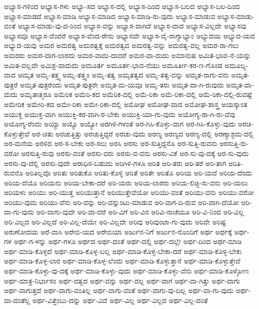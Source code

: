 {ಅಭ್ಯಾಸ-ಗಳಿಂದ
ಅಭ್ಯಾಸ-ಗಳು
ಅಭ್ಯಾ-ಸದ
ಅಭ್ಯಾಸ-ದಲ್ಲಿ
ಅಭ್ಯಾಸ-ದಿಂದ
ಅಭ್ಯಾಸ-ಬಲದ
ಅಭ್ಯಾಸ-ಬಲ-ದಿಂದ
ಅಭ್ಯಾಸ-ಮಾಡದೆ
ಅಭ್ಯಾಸ-ಮಾಡಿ
ಅಭ್ಯಾಸ-ಮಾಡಿದ
ಅಭ್ಯಾಸ-ಮಾಡಿ-ರು-ವುದು
ಅಭ್ಯಾಸ-ಮಾಡುವ
ಅಭ್ಯಾಸ-ಮಾಡು-ವಂತೆ
ಅಭ್ಯಾಸ-ಮಾಡು-ವು-ದ-ರಿಂದ
ಅಭ್ಯಾಸ-ವನ್ನು
ಅಭ್ಯಾಸ-ವಾಗಿದೆ
ಅಭ್ಯಾಸ-ವಾದ
ಅಭ್ಯಾಸ-ವಿಲ್ಲದೇ
ಅಭ್ಯಾಸವು
ಅಭ್ಯಾಸವೂ
ಅಭ್ಯಾಸ-ವೆಂದರೆ
ಅಭ್ಯಾಸ-ವೆಂದ-ರೇನು
ಅಭ್ಯಾಸವೇ
ಅಭ್ಯಾಸ-ವೈ-ರಾಗ್ಯಾಭ್ಯಾಂ
ಅಭ್ಯುದಯ
ಅಭ್ಯುದ-ಯದ
ಅಭ್ಯುದ-ಯವು
ಅಮರ
ಅಮರತ್ವ
ಅಮರತ್ವಕ್ಕೆ
ಅಮರತ್ವದ
ಅಮರತ್ವ-ವನ್ನು
ಅಮರತ್ವ-ವಲ್ಲ
ಅಮರ-ರಾ-ಗಲು
ಅಮರರು
ಅಮರ-ವಾಗ-ಲಾರದು
ಅಮರ-ವಾದು-ದಾದರೆ
ಅಮರ-ವಾ-ದುದು
ಅಮಾನುಷ
ಅಮಿತ-ಭಾವ-ನೆ-ಯನ್ನು
ಅಮಿತ-ವಲ್ಲವೇ
ಅಮಿಶ್ರ-ವಾದುದು
ಅಮೂರ್ತ
ಅಮೂರ್ತ-ಭಾವ-ನೆಯು
ಅಮೂರ್ತೀ-ಕರ-ಣ-ಗೊಂಡ
ಅಮೂಲ್ಯ-ವಾದ
ಅಮೃತ
ಅಮೃ-ತತ್ತ್ವ
ಅಮೃ-ತತ್ತ್ವಂ
ಅಮೃ-ತತ್ವ
ಅಮೃತತ್ವದ
ಅಮೃ-ತತ್ವ-ವನ್ನು
ಅಮೃತ-ನಾಗು-ವನು
ಅಮೃತ-ಪುತ್ರರೆ
ಅಮೃತ-ಪುತ್ರರೆಂದು
ಅಮೃತ-ಪುತ್ರರೇ
ಅಮೃತ-ಮ-ಯವೂ
ಅಮೃ-ತರು
ಅಮೃತ-ವಾ-ಗಿ-ರುವುದು
ಅಮೃತ-ವಾ-ದುದು
ಅಮೃತಾತ್ಮರೂ
ಅಮೆರಿಕ
ಅಮೆರಿ-ಕದ
ಅಮೆರಿಕ-ದಲ್ಲಿ
ಅಮೆ-ರಿಕಾ
ಅಮೆ-ರಿಕಾ-ದಲ್ಲಿ
ಅಮೆ-ರಿಕಾ-ದಲ್ಲಿ-ರುವಷ್ಟೆ
ಅಮೇರಿಕ
ಅಮೇರಿ-ಕದ
ಅಮೇ-ರಿಕಾ
ಅಮೇ-ರಿಕಾ-ದಲ್ಲಿ
ಅಮೋಘ
ಅಮೋಘ-ವಾದ
ಅಮೋಘ-ಶಾಸ್ತ್ರ
ಅಯಸ್ಕಾಂತ
ಅಯುಕ್ತ
ಅಯುಕ್ತ-ವಾಗಿ
ಅಯುಕ್ತಿ-ಕರ-ವಾಗಿ-ರ-ಬೇಕು
ಅಯುಕ್ತಿ-ಯಾ-ಗು-ವುದು
ಅಯೋಗ್ಯ-ರಾ-ಗಿ-ರು-ವೆವು
ಅಯೋಗ್ಯ-ರೆಂದು
ಅಯ್ಯಾ
ಅಯ್ಯೊ
ಅಯ್ಯೋ
ಅರಗಿಳಿ-ಗಳಂತೆ
ಅರ-ಗಿಸಿ-ಕೊಳ್ಳು-ವಾಗ
ಅರ-ಗಿಸಿ-ಕೊಳ್ಳು-ವುದು
ಅರಚಿ-ಕೊಳ್ಳುತ್ತೇವೆ
ಅರ-ಚಿತು
ಅರಚುತ್ತಿತ್ತು
ಅರಚುತ್ತಿದ್ದರೆ
ಅರಚು-ವುದು
ಅರಣ್ಯ
ಅರಣ್ಯದ
ಅರಣ್ಯ-ದಲ್ಲಿ
ಅರಣ್ಯಾಶ್ರಮ-ದಲ್ಲಿ
ಅರ-ಮನೆಯ
ಅರಳಿದ
ಅರ-ಸ-ಬೇಕು
ಅರ-ಸಲು
ಅರಸಿ
ಅರಸು
ಅರ-ಸುತ್ತಿದ್ದನೊ
ಅರ-ಸುತ್ತಿ-ರುವನು
ಅರಸುತ್ತಿ-ರು-ವರೋ
ಅರಸುತ್ತಿ-ರುವು
ಅರಸು-ವಂತೆ
ಅರಸು-ವರು
ಅರಸು-ವ-ವನು
ಅರಸು-ವಿಕೆ
ಅರ-ಸು-ವು-ದಕ್ಕೆ
ಅರ-ಸು-ವುದು
ಅರಸು-ವು-ದೆಲ್ಲಿ
ಅರಸು-ವುದೇ
ಅರಾಧಿಸ-ಬಹುದು
ಅರಿಗಿಳಿ-ಗಳೂ
ಅರಿತ
ಅರಿ-ತರು
ಅರಿ-ತರೆ
ಅರಿ-ತಾಗ
ಅರಿತಿ-ರುವನೊ
ಅರಿತಿಲ್ಲವೊ
ಅರಿತು
ಅರಿತುಕೊ
ಅರಿತು-ಕೊಳ್ಳಿ
ಅರಿತೆ
ಅರಿತೇ
ಅರಿತೊ
ಅರಿಯ
ಅರಿ-ಯದೆ
ಅರಿಯ-ದೆಂದು
ಅರಿಯ-ದೆಯೊ
ಅರಿಯನು
ಅರಿಯ-ಬೇಕಾ-ದರೆ
ಅರಿ-ಯರು
ಅರಿಯ-ಲಾರರು
ಅರಿಯ-ಲಿಚ್ಛಿ-ಸು-ವನು
ಅರಿ-ಯಲು
ಅರಿಯಳು
ಅರಿಯು
ಅರಿ-ಯುತ್ತ
ಅರಿಯುತ್ತಾನೆ
ಅರಿಯುತ್ತೇವೆಯೋ
ಅರಿಯು-ವಂತೆ
ಅರಿಯು-ವನು
ಅರಿಯು-ವರೋ
ಅರಿಯು-ವುದು
ಅರಿಯು-ವೆನು
ಅರಿ-ವನ್ನು
ಅರಿ-ವನ್ನುಂಟು-ಮಾಡುವ
ಅರಿ-ವಾಗ-ದಿ-ರುವ
ಅರಿ-ವಾಗಿ-ದೆಯೋ
ಅರಿ-ವಾ-ಗು-ವುದು
ಅರಿ-ವಾಗು-ವುದೇ
ಅರಿ-ವಾ-ದರೆ
ಅರಿ-ವಿಗೆ
ಅರಿ-ವಿನ
ಅರಿವಿ-ನಾಚೆಯೂ
ಅರಿ-ವಿ-ನಿಂದ
ಅರಿ-ವಿಲ್ಲ
ಅರಿ-ವಿಲ್ಲದ
ಅರಿ-ವಿಲ್ಲದೆ
ಅರಿ-ವಿಲ್ಲ-ದೆಯೇ
ಅರಿ-ವಿಲ್ಲದೇ
ಅರಿವು
ಅರಿವುಂಟಾ-ಗು-ವುದು
ಅರಿವೇ
ಅರಿಷ್ಟ
ಅರುಣೋದಯ
ಅರೆ-ವಾಸಿ
ಅರೇಬಿ-ಯದ
ಅರೇಬಿಯಾ
ಅರ್ಜುನ-ನಿಗೆ
ಅರ್ಜುನ-ನೊಂದಿಗೆ
ಅರ್ಥ
ಅರ್ಥಕ್ಕೆ
ಅರ್ಥ-ಗಳ
ಅರ್ಥ-ಗ-ಳನ್ನು
ಅರ್ಥ-ಗಳೂ
ಅರ್ಥದ
ಅರ್ಥ-ದಂತೆ
ಅರ್ಥ-ದಲ್ಲಿ
ಅರ್ಥ-ದಲ್ಲೇ
ಅರ್ಥ-ದಿಂದ
ಅರ್ಥ-ಮಾಡಿ
ಅರ್ಥ-ಮಾಡಿ-ಕೊಳ್ಳದೆ
ಅರ್ಥ-ಮಾಡಿ-ಕೊಳ್ಳ-ಬಲ್ಲ
ಅರ್ಥ-ಮಾಡಿ-ಕೊಳ್ಳ-ಬೇಕಾ-ದರೆ
ಅರ್ಥ-ಮಾಡಿ-ಕೊಳ್ಳ-ಬೇಕು
ಅರ್ಥ-ಮಾಡಿ-ಕೊಳ್ಳ-ಲಾರ
ಅರ್ಥ-ಮಾಡಿ-ಕೊಳ್ಳ-ಲೆಂದು
ಅರ್ಥ-ಮಾಡಿ-ಕೊಳ್ಳುತ್ತಾನೆ
ಅರ್ಥ-ಮಾಡಿ-ಕೊಳ್ಳುತ್ತೇವೆ
ಅರ್ಥ-ಮಾಡಿ-ಕೊಳ್ಳು-ವು-ದಕ್ಕೆ
ಅರ್ಥ-ಮಾಡಿ-ಕೊಳ್ಳು-ವುದು
ಅರ್ಥ-ಮಾಡಿ-ಕೊಳ್ಳು-ವೆನು
ಅರ್ಥ-ಮಾಡಿ-ಕೊಳ್ಳೋಣ
ಅರ್ಥ-ಮಾತ್ರ-ನಿರ್ಭಾಸಂ
ಅರ್ಥ-ವತ್ವದ
ಅರ್ಥ-ವನ್ನು
ಅರ್ಥ-ವಲ್ಲ
ಅರ್ಥ-ವಾಗ
ಅರ್ಥ-ವಾ-ಗಿತ್ತು
ಅರ್ಥ-ವಾಗು
ಅರ್ಥ-ವಾಗುತ್ತದೆ
ಅರ್ಥ-ವಾಗು-ವಂತಿಲ್ಲ
ಅರ್ಥ-ವಾಗು-ವಂತೆ
ಅರ್ಥ-ವಾಗು-ವು-ದಿಲ್ಲ
ಅರ್ಥ-ವಾ-ಗು-ವುದು
ಅರ್ಥ-ವಾ-ದಂತೆಲ್ಲ
ಅರ್ಥ-ವಿತ್ತೆಂಬು-ದನ್ನು
ಅರ್ಥ-ವಿದೆ
ಅರ್ಥ-ವಿಲ್ಲ
ಅರ್ಥ-ವಿಲ್ಲದ
ಅರ್ಥ-ವಿಲ್ಲ-ದಂತೆ
}

